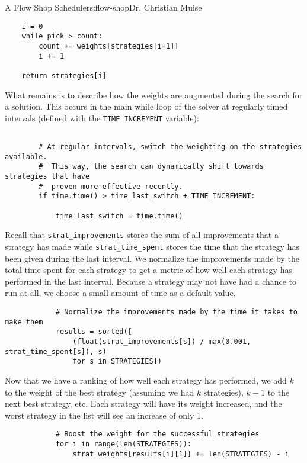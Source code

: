 \begin{aosachapter}{A Flow Shop Scheduler}{s:flow-shop}{Dr. Christian Muise}
\begin{verbatim}
    i = 0
    while pick > count:
        count += weights[strategies[i+1]]
        i += 1

    return strategies[i]
\end{verbatim}

What remains is to describe how the weights are augmented during the
search for a solution. This occurs in the main while loop of the solver
at regularly timed intervals (defined with the \texttt{TIME\_INCREMENT}
variable):

\begin{verbatim}

        # At regular intervals, switch the weighting on the strategies available.
        #  This way, the search can dynamically shift towards strategies that have
        #  proven more effective recently.
        if time.time() > time_last_switch + TIME_INCREMENT:

            time_last_switch = time.time()
\end{verbatim}

Recall that \texttt{strat\_improvements} stores the sum of all
improvements that a strategy has made while \texttt{strat\_time\_spent}
stores the time that the strategy has been given during the last
interval. We normalize the improvements made by the total time spent for
each strategy to get a metric of how well each strategy has performed in
the last interval. Because a strategy may not have had a chance to run
at all, we choose a small amount of time as a default value.

\begin{verbatim}
            # Normalize the improvements made by the time it takes to make them
            results = sorted([
                (float(strat_improvements[s]) / max(0.001, strat_time_spent[s]), s)
                for s in STRATEGIES])
\end{verbatim}

Now that we have a ranking of how well each strategy has performed, we
add $k$ to the weight of the best strategy (assuming we had $k$
strategies), $k-1$ to the next best strategy, etc. Each strategy will
have its weight increased, and the worst strategy in the list will see
an increase of only 1.

\begin{verbatim}
            # Boost the weight for the successful strategies
            for i in range(len(STRATEGIES)):
                strat_weights[results[i][1]] += len(STRATEGIES) - i
\end{verbatim}


\end{aosachapter}
